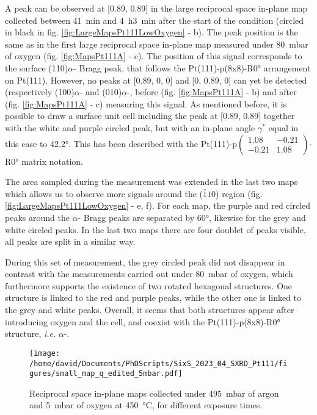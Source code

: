 A peak can be observed at [0.89, 0.89] in the large reciprocal space in-plane map collected between \qty{41}{\minute} and \qty{4}{\hour}\qty{3}{\minute} after the start of the condition (circled in black in fig. \ref{fig:LargeMapsPt111LowOxygen} - b).
The peak position is the same as in the first large reciprocal space in-plane map measured under \qty{80}{\milli\bar} of oxygen (fig. \ref{fig:MapsPt111A} - c).
The position of this signal corresponds to the surface (110)$\alpha$- Bragg peak, that follows the Pt(111)-p(8x8)-R\ang{0} arrangement on Pt(111).
However, no peaks at [0.89, 0, 0] and [0, 0.89, 0] can yet be detected (respectively (100)$\alpha$- and (010)$\alpha$-, before (fig. \ref{fig:MapsPt111A} - b) and after (fig. \ref{fig:MapsPt111A} - c) measuring this signal.
As mentioned before, it is possible to draw a surface unit cell including the peak at [0.89, 0.89] together with the white and purple circled peak, but with an in-plane angle $\gamma^*$ equal in this case to \ang{42.2}.
This has been described with the Pt(111)-p$\begin{pmatrix} 1.08 & -0.21 \\ -0.21 & 1.08 \end{pmatrix}$-R\ang{0} matrix notation.

The area sampled during the measurement was extended in the last two maps which allows us to observe more signals around the ($\bar{1}10$) region (fig. \ref{fig:LargeMapsPt111LowOxygen} - e, f).
For each map, the purple and red circled peaks around the $\alpha$- Bragg peaks are separated by \ang{60}, likewise for the grey and white circled peaks.
In the last two maps there are four doublet of peaks visible, all peaks are split in a similar way.

During this set of measurement, the grey circled peak did not disappear in contrast with the measurements carried out under \qty{80}{\milli\bar} of oxygen, which furthermore supports the existence of two rotated hexagonal structures.
One structure is linked to the red and purple peaks, while the other one is linked to the grey and white peaks.
Overall, it seems that both structures appear after introducing oxygen and the cell, and coexist with the Pt(111)-p(8x8)-R\ang{0} structure, \textit{i.e.} $\alpha$-.

\begin{figure}[!htb]
    \centering
    \texttt{[image: /home/david/Documents/PhDScripts/SixS\_2023\_04\_SXRD\_Pt111/figures/small\_map\_q\_edited\_5mbar.pdf]}
    \caption{
        Reciprocal space in-plane maps collected under \qty{495}{\milli\bar} of argon and \qty{5}{\milli\bar} of oxygen at \qty{450}{\degreeCelsius}, for different exposure times.
    }
    \label{fig:SmallMapsPt111LowOxygen}
\end{figure}

